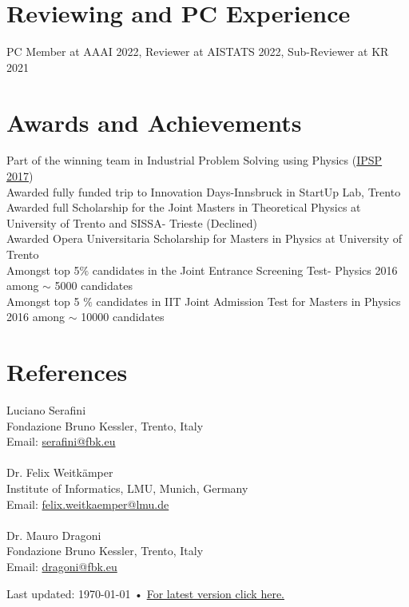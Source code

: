 \documentclass[10pt, a4paper]{article}
\newcommand{\years}[1]{\marginnote{\scriptsize #1}}
\begin{document}
\section*{Reviewing and PC Experience}
PC Member at AAAI 2022, Reviewer at AISTATS 2022, Sub-Reviewer at KR 2021


\section*{Awards and Achievements}
\years{2017} Part of the winning team in Industrial Problem Solving using Physics (\href{https://www.unitn.it/archivio/events/ipsp2017.html}{IPSP 2017})\\
\years{2017}Awarded fully funded trip to Innovation Days-Innsbruck in StartUp Lab, Trento\\
\years{2016}Awarded full Scholarship for the Joint Masters in Theoretical Physics at University of Trento and SISSA- Trieste (Declined)\\
\years{2016}Awarded Opera Universitaria Scholarship for Masters in Physics at University of Trento\\
\years{2016}Amongst top 5$\%$ candidates in the Joint Entrance Screening Test- Physics 2016 among $\sim$ 5000 candidates\\
\years{2016}Amongst top 5 $\%$ candidates in IIT Joint Admission Test for Masters in Physics  2016 among $\sim$ 10000 candidates\\


\section*{References}
Luciano Serafini \\
Fondazione Bruno Kessler, Trento, Italy\\
Email: \href{mailto: serafini@fbk.eu}{serafini@fbk.eu} \\ \\

Dr. Felix Weitkämper \\
Institute of Informatics, LMU, Munich, Germany \\
Email: \href{mailto: felix.weitkaemper@lmu.de}{felix.weitkaemper@lmu.de} \\ \\ 

Dr. Mauro Dragoni \\
Fondazione Bruno Kessler, Trento, Italy\\
Email: \href{mailto: dragoni@fbk.eu}{dragoni@fbk.eu} 





\vfill{}

\begin{center}
{\scriptsize  Last updated: \today\- •\- 
\href{https://countinglogic.github.io/research/CV/CV.pdf}{For latest version click here. }}
\end{center}
\end{document}
